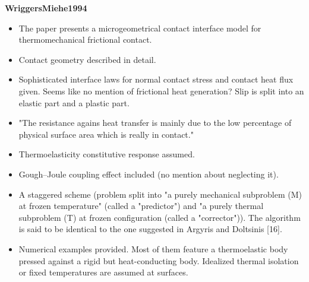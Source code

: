 \documentclass{article}
\begin{document}
\textbf{WriggersMiehe1994}

\begin{itemize}
\item The paper presents a microgeometrical contact interface model for thermomechanical frictional contact.
\item Contact geometry described in detail.
\item Sophisticated interface laws for normal contact stress and contact heat flux given. Seems like no mention of frictional heat generation? Slip is split into an elastic part and a plastic part.
\item "The resistance agains heat transfer is mainly due to the low percentage of physical surface area which is really in contact."
\item Thermoelasticity constitutive response assumed.
\item Gough--Joule coupling effect included (no mention about neglecting it).
\item A staggered scheme (problem split into "a purely mechanical subproblem (M) at frozen temperature" (called a "predictor") and "a purely thermal subproblem (T) at frozen configuration (called a "corrector")). The algorithm is said to be identical to the one suggested in Argyris and Doltsinis [16].
\item Numerical examples provided. Most of them feature a thermoelastic body pressed against a rigid but heat-conducting body. Idealized thermal isolation or fixed temperatures are assumed at surfaces.
\end{itemize}
\end{document}
